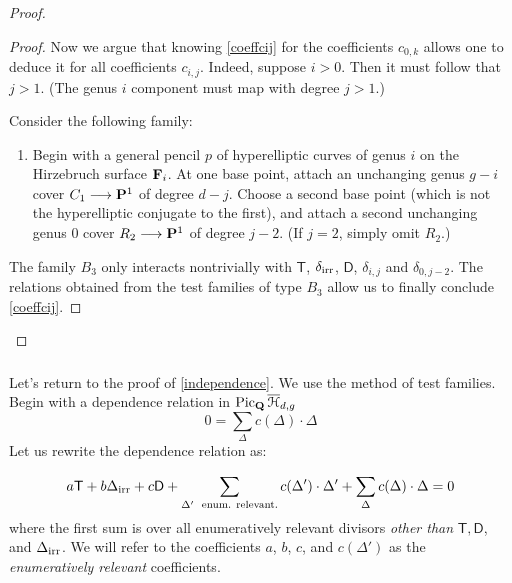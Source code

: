 \documentclass[reqno, 10 pt]{article}
\theoremstyle{definition}
\theoremstyle{remark}
\numberwithin{equation}{section}
\numberwithin{thm}{section}
\numberwithin{prop}{section}
\numberwithin{lem}{section}
\numberwithin{cor}{section}
\numberwithin{conj}{section}
\numberwithin{defn}{section}
\renewcommand{\H}{\mathcal H}
\newcommand{\F}{{\mathbf F}}
\newcommand{\Hdg}{\overline{\H}_{d,g}}
\renewcommand{\to}{\longrightarrow}
\newcommand{\sfT}{{\mathsf T}}
\newcommand{\sfD}{{\mathsf D}}
\newcommand {\Q}{{\bf Q}}
\renewcommand{\P}{{\bf P}}
\renewcommand{\F}{{\bf F}}
\renewcommand{\H}{{\mathcal{H}}}
\begin{document}
\begin{proof}
\begin{proof}
    Now we argue that knowing  \autoref{coeffcij} for the coefficients $c_{0,k}$ allows one to deduce it for all coefficients $c_{i,j}$.  Indeed, suppose $i >0$.  Then it must follow that $j > 1$.  (The genus $i$ component must map with degree $j > 1$.)  

    Consider the following family:  
    \begin{enumerate}[$B_{3}$:]
    \item Begin with a general pencil $p$ of hyperelliptic curves of genus $i$ on the Hirzebruch surface $\F_{i}$.  At one base point, attach an unchanging genus $g-i$ cover $C_{1} \to \P^{1}$ of degree $d-j$.  Choose a second base point (which is not the hyperelliptic conjugate to the first),  and attach a second unchanging genus $0$ cover $R_{2} \to \P^{1}$ of degree $j-2$.  (If $j = 2$, simply omit $R_{2}$.) 
    \end{enumerate}
    The family $B_{3}$ only interacts nontrivially with $\sfT$, $\delta_{\rm irr}$, $\sfD$, $\delta_{i,j}$ and $\delta_{0,j-2}$.  The relations obtained from the test families of type $B_{3}$ allow us to finally conclude  \autoref{coeffcij}.

    \end{proof}

    \end{proof}


  \subsubsection{}
    
    Let's return to the proof of \autoref{independence}. We use the method of test families.  Begin with a dependence relation in ${\rm Pic}_{\Q}\, \Hdg$ \[ 0 = \sum_\Delta c(\Delta) \cdot \Delta\]    Let us rewrite the dependence relation as: 


    \begin{equation}\label{hyprelation}
    a \sfT + b\Delta_{\rm irr} + c\sfD + \sum_{\Delta'\text{\,\, enum. relevant.}} c(\Delta') \cdot \Delta' + \sum_{\Delta}c(\Delta)\cdot \Delta = 0
    \end{equation}
     where the first sum is over all  enumeratively relevant divisors {\sl other than} $\sfT, \sfD$, and $\Delta_{\rm irr}$.  We will refer to the coefficients $a$, $b$, $c$, and $c(\Delta')$ as the {\sl enumeratively relevant} coefficients. 

  \subsubsection{}
\end{document}
